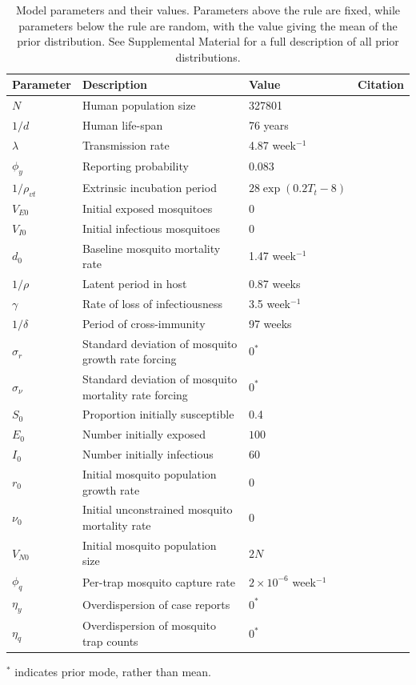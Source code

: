 \documentclass[10pt,letterpaper]{article}
\begin{document}
\begin{table}[!ht]
\label{parameters}
\begin{adjustwidth}{-2.25in}{0in} 
\begin{center}
\caption{Model parameters and their values.  Parameters above the rule are fixed, while parameters below the rule are random, with the value giving the mean of the prior distribution. See Supplemental Material for a full description of all prior distributions.}
\begin{tabular}{llll}
Parameter & Description & Value & Citation\\
\hline
$N$ & Human population size & 327801 & \cite{vitpop} \\
$1/d$ & Human life-span & 76 years & \cite{vitlong} \\
$\lambda$ & Transmission rate & 4.87 week$^{-1}$ & \cite{Scott2000}\\
$\phi_y$ & Reporting probability & 0.083 & \cite{Silva2016}\\
$1/\rho_{vt}$ & Extrinsic incubation period & $28\exp \left( 0.2 T_t - 8 \right)$ & \cite{Chan2012}\\
$V_{E0}$ & Initial exposed mosquitoes &  0 & \\
$V_{I0}$ & Initial infectious mosquitoes & 0 & \\
\hline
$d_0$ & Baseline mosquito mortality rate & 1.47 week$^{-1}$ & \cite{Brady2013} \\
$1/\rho$ & Latent period in host & 0.87 weeks  & \cite{Chan2012}\\
$\gamma$ & Rate of loss of infectiousness & 3.5 week$^{-1}$ & \cite{Nguyet2013}\\
$1/\delta$ & Period of cross-immunity & 97 weeks &  \cite{Reich2013}\\
$\sigma_r$ & Standard deviation of mosquito growth rate forcing & $0^*$ & \\
$\sigma_{\nu}$ & Standard deviation of mosquito mortality rate forcing & $0^*$ & \\
$S_0$ & Proportion initially susceptible & 0.4 & \cite{Cardoso2011a} \\
$E_0$ & Number initially exposed & $100$ & \\
$I_0$ & Number initially infectious & $60$ & \\
$r_0$ & Initial mosquito population growth rate & 0 & \\
$\nu_0$ & Initial unconstrained mosquito mortality rate & 0 & \\
$V_{N0}$ & Initial mosquito population size & $2N$ & \\
$\phi_q$ & Per-trap mosquito capture rate & $2 \times 10^{-6}$ week$^{-1}$ & \\
$\eta_y$ & Overdispersion of case reports & $0^*$ & \\
$\eta_q$ & Overdispersion of mosquito trap counts & $0^*$ & \\
\end{tabular}
\end{center}
\end{adjustwidth}
$^*$ indicates prior mode, rather than mean.
\end{table}
\end{document}
